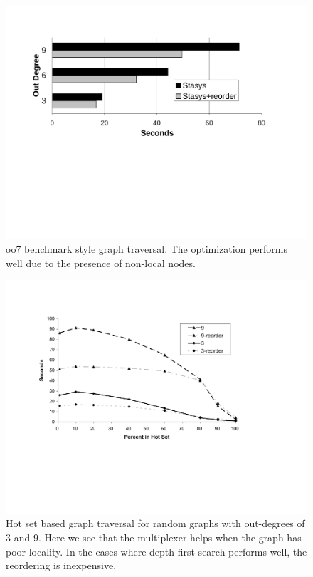 \documentclass[letterpaper,twocolumn,10pt]{article}
\begin{document}
\begin{figure}[t]
\includegraphics[width=1\columnwidth]{figs/oo7.pdf}
\vspace{-15pt}
\caption{\sf\label{fig:oo7} oo7 benchmark style graph traversal.  The optimization performs well due to the presence of non-local nodes.}
\end{figure}

\begin{figure}[t]
\includegraphics[width=1\columnwidth]{figs/trans-closure-hotset.pdf}
\vspace{-12pt}
\caption{\sf\label{fig:hotGraph} Hot set based graph traversal for random graphs with out-degrees of 3 and 9.  Here
we see that the multiplexer helps when the graph has poor locality.
In the cases where depth first search performs well, the
reordering is inexpensive.}
\end{figure}
\end{document}

